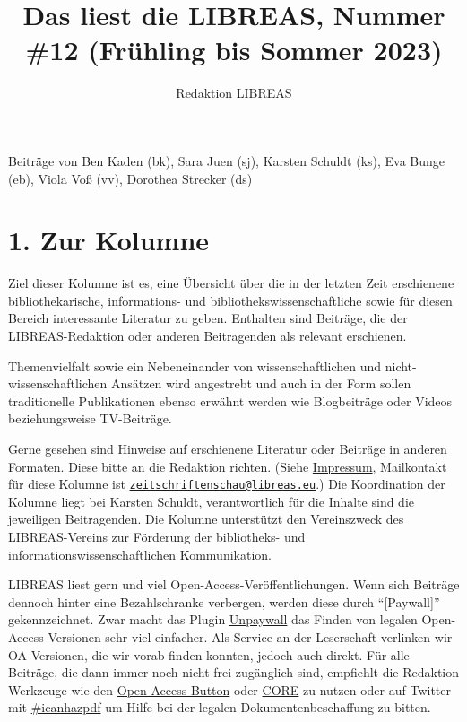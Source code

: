 \documentclass[a4paper,
fontsize=11pt,
oneside,
numbers=noperiodatend,
parskip=half-,
bibliography=totoc,
final
]{scrartcl}
\title{\LARGE{Das liest die LIBREAS, Nummer \#12 (Frühling bis Sommer 2023)}}%
\author{Redaktion LIBREAS} %
\date{}
\begin{document}
\maketitle
\thispagestyle{fancyplain} 


Beiträge von Ben Kaden (bk), Sara Juen (sj), Karsten Schuldt (ks), Eva
Bunge (eb), Viola Voß (vv), Dorothea Strecker (ds)

\hypertarget{zur-kolumne}{%
\section{1. Zur Kolumne}\label{zur-kolumne}}

Ziel dieser Kolumne ist es, eine Übersicht über die in der letzten Zeit
erschienene bibliothekarische, informations- und
bibliothekswissenschaftliche sowie für diesen Bereich interessante
Literatur zu geben. Enthalten sind Beiträge, die der LIBREAS-Redaktion
oder anderen Beitragenden als relevant erschienen.

Themenvielfalt sowie ein Nebeneinander von wissenschaftlichen und
nicht-wissenschaftlichen Ansätzen wird angestrebt und auch in der Form
sollen traditionelle Publikationen ebenso erwähnt werden wie
Blogbeiträge oder Videos beziehungsweise TV-Beiträge.

Gerne gesehen sind Hinweise auf erschienene Literatur oder Beiträge in
anderen Formaten. Diese bitte an die Redaktion richten. (Siehe
\href{http://libreas.eu/about/}{Impressum}, Mailkontakt für diese
Kolumne ist
\href{mailto:zeitschriftenschau@libreas.eu}{\nolinkurl{zeitschriftenschau@libreas.eu}}.)
Die Koordination der Kolumne liegt bei Karsten Schuldt, verantwortlich
für die Inhalte sind die jeweiligen Beitragenden. Die Kolumne
unterstützt den Vereinszweck des LIBREAS-Vereins zur Förderung der
bibliotheks- und informationswissenschaftlichen Kommunikation.

LIBREAS liest gern und viel Open-Access-Veröffentlichungen. Wenn sich
Beiträge dennoch hinter eine Bezahlschranke verbergen, werden diese
durch \enquote{{[}Paywall{]}} gekennzeichnet. Zwar macht das Plugin
\href{http://unpaywall.org/}{Unpaywall} das Finden von legalen
Open-Access-Versionen sehr viel einfacher. Als Service an der
Leserschaft verlinken wir OA-Versionen, die wir vorab finden konnten,
jedoch auch direkt. Für alle Beiträge, die dann immer noch nicht frei
zugänglich sind, empfiehlt die Redaktion Werkzeuge wie den
\href{https://openaccessbutton.org/}{Open Access Button} oder
\href{https://core.ac.uk/services/discovery/}{CORE} zu nutzen oder auf
Twitter mit
\href{https://twitter.com/hashtag/icanhazpdf?src=hash}{\#icanhazpdf} um
Hilfe bei der legalen Dokumentenbeschaffung zu bitten.
\end{document}
